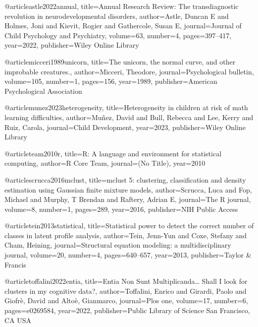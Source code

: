 @article{astle2022annual,
  title={Annual Research Review: The transdiagnostic revolution in neurodevelopmental disorders},
  author={Astle, Duncan E and Holmes, Joni and Kievit, Rogier and Gathercole, Susan E},
  journal={Journal of Child Psychology and Psychiatry},
  volume={63},
  number={4},
  pages={397--417},
  year={2022},
  publisher={Wiley Online Library}
}

@article{micceri1989unicorn,
  title={The unicorn, the normal curve, and other improbable creatures.},
  author={Micceri, Theodore},
  journal={Psychological bulletin},
  volume={105},
  number={1},
  pages={156},
  year={1989},
  publisher={American Psychological Association}
}

@article{munez2023heterogeneity,
  title={Heterogeneity in children at risk of math learning difficulties},
  author={Mu{\~n}ez, David and Bull, Rebecca and Lee, Kerry and Ruiz, Carola},
  journal={Child Development},
  year={2023},
  publisher={Wiley Online Library}
}

@article{team2010r,
  title={R: A language and environment for statistical computing},
  author={{R Core Team}},
  journal={(No Title)},
  year={2010}
}

@article{scrucca2016mclust,
  title={mclust 5: clustering, classification and density estimation using Gaussian finite mixture models},
  author={Scrucca, Luca and Fop, Michael and Murphy, T Brendan and Raftery, Adrian E},
  journal={The R journal},
  volume={8},
  number={1},
  pages={289},
  year={2016},
  publisher={NIH Public Access}
}


@article{tein2013statistical,
  title={Statistical power to detect the correct number of classes in latent profile analysis},
  author={Tein, Jenn-Yun and Coxe, Stefany and Cham, Heining},
  journal={Structural equation modeling: a multidisciplinary journal},
  volume={20},
  number={4},
  pages={640--657},
  year={2013},
  publisher={Taylor \& Francis}
}

@article{toffalini2022entia,
  title={Entia Non Sunt Multiplicanda… Shall I look for clusters in my cognitive data?},
  author={Toffalini, Enrico and Girardi, Paolo and Giofr{\`e}, David and Alto{\`e}, Gianmarco},
  journal={Plos one},
  volume={17},
  number={6},
  pages={e0269584},
  year={2022},
  publisher={Public Library of Science San Francisco, CA USA}
}




